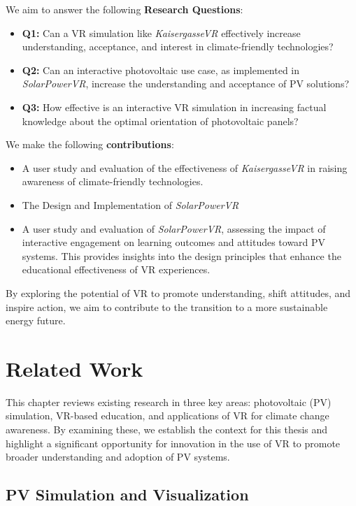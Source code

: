 \documentclass[draft, final]{vutinfth} %
\begin{document}
We aim to answer the following \textbf{Research Questions}:
\begin{itemize}
    \item \textbf{Q1:} Can a VR simulation like \textit{KaisergasseVR} effectively increase understanding, acceptance, and interest in climate-friendly technologies?
    \item \textbf{Q2:} Can an interactive photovoltaic use case, as implemented in \textit{SolarPowerVR}, increase the understanding and acceptance of PV solutions?
    \item \textbf{Q3:} How effective is an interactive VR simulation in increasing factual knowledge about the optimal orientation of photovoltaic panels?
\end{itemize}

We make the following \textbf{contributions}:
\begin{itemize}
    \item A user study and evaluation of the effectiveness of \textit{KaisergasseVR} in raising awareness of climate-friendly technologies.
    \item The Design and Implementation of \textit{SolarPowerVR}
    \item A user study and evaluation of \textit{SolarPowerVR}, assessing the impact of interactive engagement on learning outcomes and attitudes toward PV systems. This provides insights into the design principles that enhance the educational effectiveness of VR experiences.
\end{itemize}

By exploring the potential of VR to promote understanding, shift attitudes, and inspire action, we aim to contribute to the transition to a more sustainable energy future.

\chapter{Related Work}

This chapter reviews existing research in three key areas: photovoltaic (PV) simulation, VR-based education, and applications of VR for climate change awareness. By examining these, we establish the context for this thesis and highlight a significant opportunity for innovation in the use of VR to promote broader understanding and adoption of PV systems.

\section{PV Simulation and Visualization}
\end{document}
